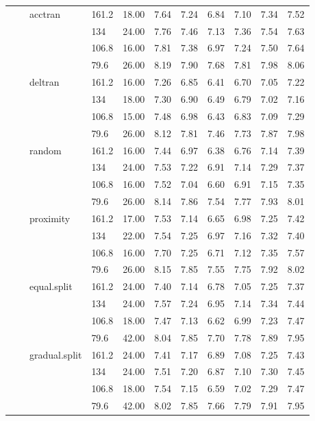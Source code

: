 \begin{longtable}{llllrrrrrrr}
   &  & acctran & 161.2 & 18.00 & 7.64 & 7.24 & 6.84 & 7.10 & 7.34 & 7.52 \\ 
   &  &  & 134 & 24.00 & 7.76 & 7.46 & 7.13 & 7.36 & 7.54 & 7.63 \\ 
   &  &  & 106.8 & 16.00 & 7.81 & 7.38 & 6.97 & 7.24 & 7.50 & 7.64 \\ 
   &  &  & 79.6 & 26.00 & 8.19 & 7.90 & 7.68 & 7.81 & 7.98 & 8.06 \\ 
   &  & deltran & 161.2 & 16.00 & 7.26 & 6.85 & 6.41 & 6.70 & 7.05 & 7.22 \\ 
   &  &  & 134 & 18.00 & 7.30 & 6.90 & 6.49 & 6.79 & 7.02 & 7.16 \\ 
   &  &  & 106.8 & 15.00 & 7.48 & 6.98 & 6.43 & 6.83 & 7.09 & 7.29 \\ 
   &  &  & 79.6 & 26.00 & 8.12 & 7.81 & 7.46 & 7.73 & 7.87 & 7.98 \\ 
   &  & random & 161.2 & 16.00 & 7.44 & 6.97 & 6.38 & 6.76 & 7.14 & 7.39 \\ 
   &  &  & 134 & 24.00 & 7.53 & 7.22 & 6.91 & 7.14 & 7.29 & 7.37 \\ 
   &  &  & 106.8 & 16.00 & 7.52 & 7.04 & 6.60 & 6.91 & 7.15 & 7.35 \\ 
   &  &  & 79.6 & 26.00 & 8.14 & 7.86 & 7.54 & 7.77 & 7.93 & 8.01 \\ 
   &  & proximity & 161.2 & 17.00 & 7.53 & 7.14 & 6.65 & 6.98 & 7.25 & 7.42 \\ 
   &  &  & 134 & 22.00 & 7.54 & 7.25 & 6.97 & 7.16 & 7.32 & 7.40 \\ 
   &  &  & 106.8 & 16.00 & 7.70 & 7.25 & 6.71 & 7.12 & 7.35 & 7.57 \\ 
   &  &  & 79.6 & 26.00 & 8.15 & 7.85 & 7.55 & 7.75 & 7.92 & 8.02 \\ 
   &  & equal.split & 161.2 & 24.00 & 7.40 & 7.14 & 6.78 & 7.05 & 7.25 & 7.37 \\ 
   &  &  & 134 & 24.00 & 7.57 & 7.24 & 6.95 & 7.14 & 7.34 & 7.44 \\ 
   &  &  & 106.8 & 18.00 & 7.47 & 7.13 & 6.62 & 6.99 & 7.23 & 7.47 \\ 
   &  &  & 79.6 & 42.00 & 8.04 & 7.85 & 7.70 & 7.78 & 7.89 & 7.95 \\ 
   &  & gradual.split & 161.2 & 24.00 & 7.41 & 7.17 & 6.89 & 7.08 & 7.25 & 7.43 \\ 
   &  &  & 134 & 24.00 & 7.51 & 7.20 & 6.87 & 7.10 & 7.30 & 7.45 \\ 
   &  &  & 106.8 & 18.00 & 7.54 & 7.15 & 6.59 & 7.02 & 7.29 & 7.47 \\ 
   &  &  & 79.6 & 42.00 & 8.02 & 7.85 & 7.66 & 7.79 & 7.91 & 7.95 \\ 

\end{longtable}
